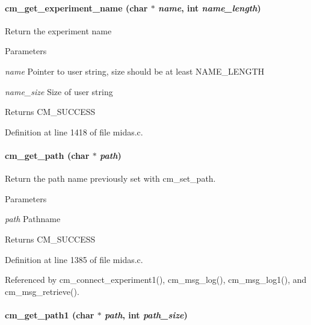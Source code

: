 \paragraph[{cm\_\-get\_\-experiment\_\-name}]{ cm\_\-get\_\-experiment\_\-name (char $\ast$ {\em name}, \/  int {\em name\_\-length})}\hfill\label{group__cmfunctionc_ga0ca8a626fc6fbdbfde87294eb38ad94d}
Return the experiment name 
\begin{DoxyParams}{Parameters}
\item[{\em name}]Pointer to user string, size should be at least NAME\_\-LENGTH \item[{\em name\_\-size}]Size of user string \end{DoxyParams}
\begin{DoxyReturn}{Returns}
CM\_\-SUCCESS 
\end{DoxyReturn}


Definition at line 1418 of file midas.c.
\paragraph[{cm\_\-get\_\-path}]{ cm\_\-get\_\-path (char $\ast$ {\em path})}\hfill\label{group__cmfunctionc_gacfe11e1f0404bc4112d749eb0793671e}
Return the path name previously set with cm\_\-set\_\-path. 
\begin{DoxyParams}{Parameters}
\item[{\em path}]Pathname \end{DoxyParams}
\begin{DoxyReturn}{Returns}
CM\_\-SUCCESS 
\end{DoxyReturn}


Definition at line 1385 of file midas.c.

Referenced by cm\_\-connect\_\-experiment1(), cm\_\-msg\_\-log(), cm\_\-msg\_\-log1(), and cm\_\-msg\_\-retrieve().
\paragraph[{cm\_\-get\_\-path1}]{ cm\_\-get\_\-path1 (char $\ast$ {\em path}, \/  int {\em path\_\-size})}\hfill\label{group__cmfunctionc_ga2e1de5d518d7be99062d074c5482ae88}


